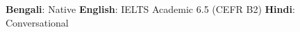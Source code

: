 %
%
%



\vspace{0.5em}

\begin{languages}
	\vspace{0.1em}
    \textbf{Bengali}: Native \quad
	\textbf{English}: IELTS Academic 6.5 (CEFR B2) \quad
	\textbf{Hindi}: Conversational
\end{languages}

